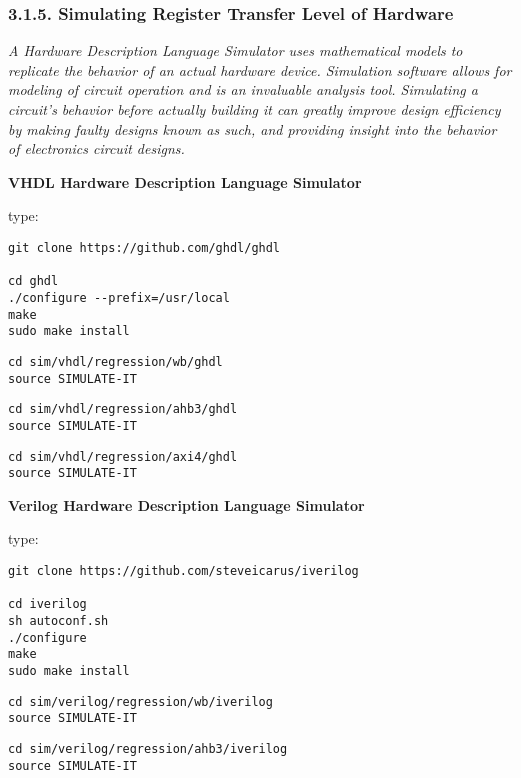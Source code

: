 \documentclass[]{article}
\begin{document}
\subsubsection{3.1.5. Simulating Register Transfer Level of
Hardware}\label{simulating-register-transfer-level-of-hardware}

\emph{A Hardware Description Language Simulator uses mathematical models
to replicate the behavior of an actual hardware device. Simulation
software allows for modeling of circuit operation and is an invaluable
analysis tool. Simulating a circuit's behavior before actually building
it can greatly improve design efficiency by making faulty designs known
as such, and providing insight into the behavior of electronics circuit
designs.}

\textbf{VHDL Hardware Description Language Simulator}

type:

\begin{verbatim}
git clone https://github.com/ghdl/ghdl

cd ghdl
./configure --prefix=/usr/local
make
sudo make install
\end{verbatim}

\begin{verbatim}
cd sim/vhdl/regression/wb/ghdl
source SIMULATE-IT
\end{verbatim}

\begin{verbatim}
cd sim/vhdl/regression/ahb3/ghdl
source SIMULATE-IT
\end{verbatim}

\begin{verbatim}
cd sim/vhdl/regression/axi4/ghdl
source SIMULATE-IT
\end{verbatim}

\textbf{Verilog Hardware Description Language Simulator}

type:

\begin{verbatim}
git clone https://github.com/steveicarus/iverilog

cd iverilog
sh autoconf.sh
./configure
make
sudo make install
\end{verbatim}

\begin{verbatim}
cd sim/verilog/regression/wb/iverilog
source SIMULATE-IT
\end{verbatim}

\begin{verbatim}
cd sim/verilog/regression/ahb3/iverilog
source SIMULATE-IT
\end{verbatim}
\end{document}
